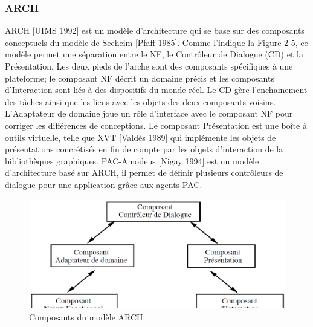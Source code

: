 \subsubsection{ARCH}
ARCH [UIMS 1992] est un modèle d'architecture qui se base sur des composants conceptuels du modèle de Seeheim [Pfaff 1985]. Comme l'indique la Figure 2 5, ce modèle permet une séparation entre le NF, le Contrôleur de Dialogue (CD) et la Présentation. Les deux pieds de l'arche sont des composants spécifiques à une plateforme; le composant NF décrit un domaine précis et les composants d'Interaction sont liés à des dispositifs du monde réel. Le CD gère l'enchainement des tâches ainsi que les liens avec les objets des deux composants voisins. L'Adaptateur de domaine joue un rôle d'interface avec le composant NF pour corriger les différences de conceptions. Le composant Présentation est une boîte à outils virtuelle, telle que XVT [Valdès 1989] qui implémente les objets de présentations concrétisés en fin de compte par les objets d'interaction de la bibliothèques graphiques.
PAC-Amodeus [Nigay 1994] est un modèle d'architecture basé sur ARCH, il permet de définir plusieurs contrôleurs de dialogue pour une application grâce aux agents  PAC.  
\begin{figure}[ht]
\begin{center}
\includegraphics[width=340pt]{chap2/img-7.eps}
\caption{Composants du modèle ARCH}\label{fig:5}
\end{center}
\end{figure}
